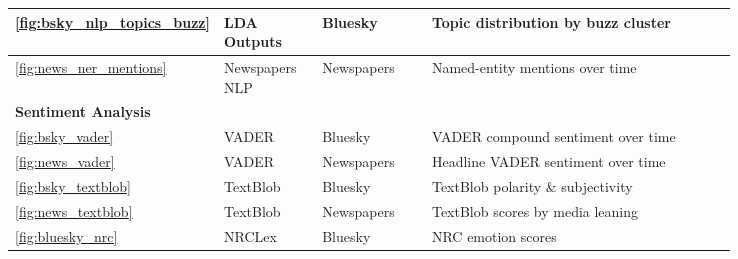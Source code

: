 \begin{longtable}{|p{0.05\linewidth}|p{0.14\linewidth}|p{0.16\linewidth}|p{0.43\linewidth}|p{0.06\linewidth}|}
\textcolor{textmuted}{\small\ref{fig:bsky_nlp_topics_buzz}}        & \textcolor{textmuted}{\small LDA Outputs}         & \textcolor{textmuted}{\small Bluesky}         & \textcolor{textmuted}{\small Topic distribution by buzz cluster}       & \textcolor{textmuted}{\small\pageref{fig:bsky_nlp_topics_buzz}} \\\hline
\textcolor{textmuted}{\small\ref{fig:news_ner_mentions}}           & \textcolor{textmuted}{\small Newspapers NLP}      & \textcolor{textmuted}{\small Newspapers}      & \textcolor{textmuted}{\small Named-entity mentions over time}          & \textcolor{textmuted}{\small\pageref{fig:news_ner_mentions}} \\\hline

\multicolumn{5}{|l|}{\rule[-0.3em]{0pt}{1.2em}\textcolor{textprimary}{\sffamily\bfseries\small\enspace 5 \enspace Sentiment Analysis}} \\
\hline
\textcolor{textmuted}{\small\ref{fig:bsky_vader}}                  & \textcolor{textmuted}{\small VADER}             & \textcolor{textmuted}{\small Bluesky}         & \textcolor{textmuted}{\small VADER compound sentiment over time}        & \textcolor{textmuted}{\small\pageref{fig:bsky_vader}} \\\hline
\textcolor{textmuted}{\small\ref{fig:news_vader}}                  & \textcolor{textmuted}{\small VADER}             & \textcolor{textmuted}{\small Newspapers}      & \textcolor{textmuted}{\small Headline VADER sentiment over time}        & \textcolor{textmuted}{\small\pageref{fig:news_vader}} \\\hline
\textcolor{textmuted}{\small\ref{fig:bsky_textblob}}               & \textcolor{textmuted}{\small TextBlob}          & \textcolor{textmuted}{\small Bluesky}         & \textcolor{textmuted}{\small TextBlob polarity \& subjectivity}         & \textcolor{textmuted}{\small\pageref{fig:bsky_textblob}} \\\hline
\textcolor{textmuted}{\small\ref{fig:news_textblob}}               & \textcolor{textmuted}{\small TextBlob}          & \textcolor{textmuted}{\small Newspapers}      & \textcolor{textmuted}{\small TextBlob scores by media leaning}          & \textcolor{textmuted}{\small\pageref{fig:news_textblob}} \\\hline
\textcolor{textmuted}{\small\ref{fig:bluesky_nrc}}                 & \textcolor{textmuted}{\small NRCLex}            & \textcolor{textmuted}{\small Bluesky}         & \textcolor{textmuted}{\small NRC emotion scores}                        & \textcolor{textmuted}{\small\pageref{fig:bluesky_nrc}} \\\hline

\end{longtable}
